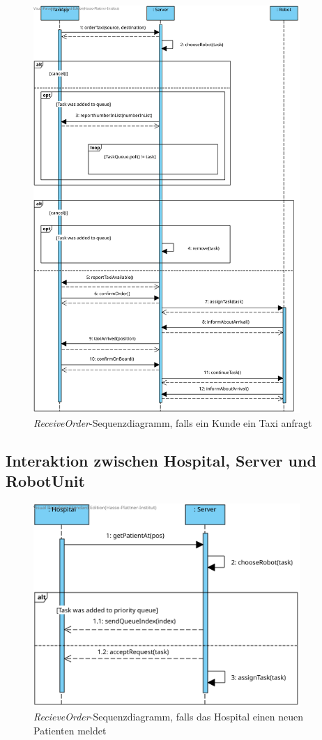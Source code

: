 \begin{figure}[H]
	\centering
	\includegraphics[width=0.9\textwidth]{img/2-Entwurf-ReceiveOrder-Taxi}
	\caption{\emph{ReceiveOrder}-Sequenzdiagramm, falls ein Kunde ein Taxi anfragt}
	\label{SequenzDiagrammInteraktionTaxi}
\end{figure}

\subsection*{Interaktion zwischen Hospital, Server und RobotUnit}

\begin{figure}[H]
	\centering
	\includegraphics[width=0.9\textwidth]{img/2-Entwurf-ReceiveOrder-Hosp}
	\caption{\emph{RecieveOrder}-Sequenzdiagramm, falls das Hospital einen neuen Patienten meldet}
	\label{SequenzDiagrammInteraktionHospital}
\end{figure}

